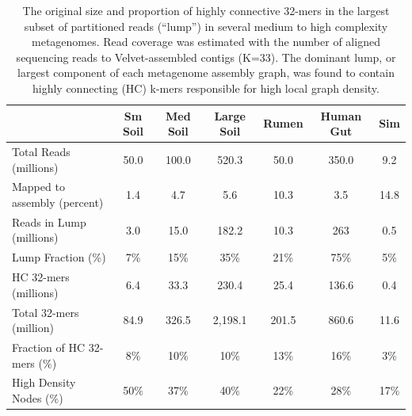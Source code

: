 \documentclass[10pt]{article}
\begin{document}



\pagebreak

\begin{table}[ht]
\centering
\caption{The original size and proportion of highly connective 32-mers in the largest subset of partitioned reads (``lump'') in several medium to high complexity metagenomes.  Read coverage was estimated with the number of aligned sequencing reads to Velvet-assembled contigs (K=33).  The dominant lump, or largest component of each metagenome assembly graph, was found to contain highly connecting (HC) k-mers responsible for high local graph density.}
\begin{tabular}{l c c c c c c }

& Sm Soil & Med Soil & Large Soil & Rumen & Human Gut & Sim  \\
\hline
Total Reads (millions) & 50.0 & 100.0 & 520.3 & 50.0 & 350.0 & 9.2 \\
Mapped to assembly (percent) & 1.4 & 4.7 & 5.6 & 10.3 & 3.5 & 14.8 \\
Reads in Lump (millions) & 3.0  & 15.0 & 182.2 & 10.3  & 263  & 0.5  \\
Lump Fraction (\%) & 7\% & 15\% & 35\% & 21\% & 75\% & 5\%\\
HC 32-mers (millions) & 6.4 & 33.3 & 230.4 & 25.4 & 136.6 & 0.4\\
Total 32-mers (million) & 84.9 & 326.5 & 2,198.1 & 201.5 & 860.6 & 11.6\\
Fraction of HC 32-mers (\%) & 8\% & 10\% & 10\% & 13\% & 16\% & 3\% \\
High Density Nodes (\%) & 50\% & 37\% & 40\% & 22\% & 28\% & 17\% \\

\hline
\end{tabular}
\end{table}
\end{document}

